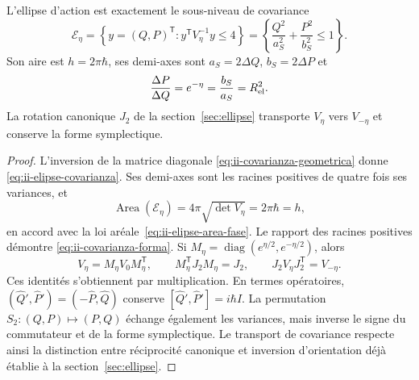 \begin{proposition}
\label{prop:ii-area-covarianza-reciprocidad}
L'ellipse d'action est exactement le sous-niveau de covariance
\begin{equation}
 \mathcal E_\eta
 =\left\{y=(Q,P)^{\mathsf T}:y^{\mathsf T}V_\eta^{-1}y\leq4\right\}
 =\left\{\frac{Q^2}{a_S^2}+\frac{P^2}{b_S^2}\leq1\right\}.
 \label{eq:ii-elipse-covarianza}
\end{equation}
Son aire est \(h=2\pi\hbar\), ses demi-axes sont
\(a_S=2\Delta Q\), \(b_S=2\Delta P\) et
\begin{equation}
 \frac{\Delta P}{\Delta Q}=e^{-\eta}
 =\frac{b_S}{a_S}=R_{\rm el}^2.
 \label{eq:ii-covarianza-forma}
\end{equation}
La rotation canonique \(J_2\) de la section~\ref{sec:ellipse} transporte
\(V_\eta\) vers \(V_{-\eta}\) et conserve la forme symplectique.
\end{proposition}

\begin{proof}
L'inversion de la matrice diagonale
\eqref{eq:ii-covarianza-geometrica} donne
\eqref{eq:ii-elipse-covarianza}. Ses demi-axes sont les racines positives de
quatre fois ses variances, et
\[
 \operatorname{Area}(\mathcal E_\eta)
 =4\pi\sqrt{\det V_\eta}=2\pi\hbar=h,
\]
en accord avec la loi aréale~\eqref{eq:ii-elipse-area-fase}.
Le rapport des racines positives démontre
\eqref{eq:ii-covarianza-forma}.
Si \(M_\eta=\operatorname{diag}(e^{\eta/2},e^{-\eta/2})\), alors
\[
 V_\eta=M_\eta V_0M_\eta^{\mathsf T},\qquad
 M_\eta^{\mathsf T}J_2M_\eta=J_2,\qquad
 J_2V_\eta J_2^{\mathsf T}=V_{-\eta}.
\]
Ces identités s'obtiennent par multiplication. En termes opératoires,
\((\widehat Q',\widehat P')=(-\widehat P,\widehat Q)\) conserve
\([\widehat Q',\widehat P']=i\hbar I\). La permutation
\(S_2:(Q,P)\mapsto(P,Q)\) échange également les variances, mais inverse
le signe du commutateur et de la forme symplectique. Le transport de
covariance respecte ainsi la distinction entre réciprocité canonique et inversion
d'orientation déjà établie à la section~\ref{sec:ellipse}.
\end{proof}

